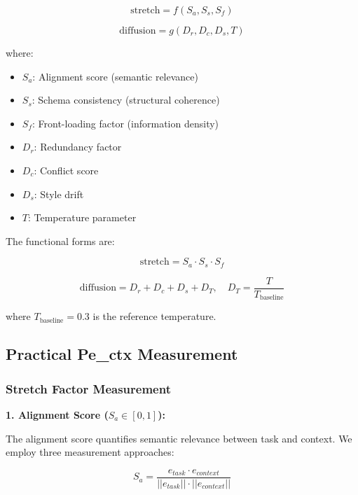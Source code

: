\documentclass[conference]{IEEEtran}
\begin{document}
\begin{equation}
\text{stretch} = f(S_a, S_s, S_f)
\end{equation}

\begin{equation}
\text{diffusion} = g(D_r, D_c, D_s, T)
\end{equation}

where:
\begin{itemize}
\item $S_a$: Alignment score (semantic relevance)
\item $S_s$: Schema consistency (structural coherence)
\item $S_f$: Front-loading factor (information density)
\item $D_r$: Redundancy factor
\item $D_c$: Conflict score
\item $D_s$: Style drift
\item $T$: Temperature parameter
\end{itemize}

The functional forms are:

\begin{equation}
\text{stretch} = S_a \cdot S_s \cdot S_f
\end{equation}

\begin{equation}
\text{diffusion} = D_r + D_c + D_s + D_T, \quad D_T = \frac{T}{T_{\text{baseline}}}
\end{equation}

where $T_{\text{baseline}} = 0.3$ is the reference temperature.

\subsection{Practical Pe\_ctx Measurement}

\subsubsection{Stretch Factor Measurement}

\textbf{1. Alignment Score ($S_a \in [0,1]$):}

The alignment score quantifies semantic relevance between task and context. We employ three measurement approaches:

\begin{equation}
S_a = \frac{e_{task} \cdot e_{context}}{||e_{task}|| \cdot ||e_{context}||}
\end{equation}
\end{document}
